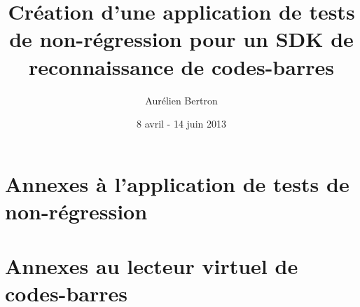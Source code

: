 \documentclass[10pt,a4paper]{report}
\author{Aurélien Bertron}
\date{8 avril - 14 juin 2013}
\title{Création d'une application de tests de non-régression pour un SDK de reconnaissance de codes-barres}
\begin{document}
\maketitle



\tableofcontents
\listoffigures











\appendix
\part*{Annexes à l'application de tests de non-régression}

\part*{Annexes au lecteur virtuel de codes-barres}

\end{document}

